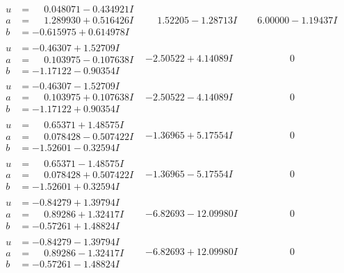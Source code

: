 \documentclass[1p]{elsarticle_modified}
\theoremstyle{definition}
\begin{document}
$$\begin{array}{c|c|c}
\begin{aligned}
u &= \phantom{-}0.048071 - 0.434921 I \\
a &= \phantom{-}1.289930 + 0.516426 I \\
b &= -0.615975 + 0.614978 I\end{aligned}
 & \phantom{-}1.52205 - 1.28713 I & \phantom{-}6.00000 - 1.19437 I \\ \hline\begin{aligned}
u &= -0.46307 + 1.52709 I \\
a &= \phantom{-}0.103975 - 0.107638 I \\
b &= -1.17122 - 0.90354 I\end{aligned}
 & -2.50522 + 4.14089 I & \phantom{-0.000000 } 0 \\ \hline\begin{aligned}
u &= -0.46307 - 1.52709 I \\
a &= \phantom{-}0.103975 + 0.107638 I \\
b &= -1.17122 + 0.90354 I\end{aligned}
 & -2.50522 - 4.14089 I & \phantom{-0.000000 } 0 \\ \hline\begin{aligned}
u &= \phantom{-}0.65371 + 1.48575 I \\
a &= \phantom{-}0.078428 - 0.507422 I \\
b &= -1.52601 - 0.32594 I\end{aligned}
 & -1.36965 + 5.17554 I & \phantom{-0.000000 } 0 \\ \hline\begin{aligned}
u &= \phantom{-}0.65371 - 1.48575 I \\
a &= \phantom{-}0.078428 + 0.507422 I \\
b &= -1.52601 + 0.32594 I\end{aligned}
 & -1.36965 - 5.17554 I & \phantom{-0.000000 } 0 \\ \hline\begin{aligned}
u &= -0.84279 + 1.39794 I \\
a &= \phantom{-}0.89286 + 1.32417 I \\
b &= -0.57261 + 1.48824 I\end{aligned}
 & -6.82693 - 12.09980 I & \phantom{-0.000000 } 0 \\ \hline\begin{aligned}
u &= -0.84279 - 1.39794 I \\
a &= \phantom{-}0.89286 - 1.32417 I \\
b &= -0.57261 - 1.48824 I\end{aligned}
 & -6.82693 + 12.09980 I & \phantom{-0.000000 } 0 \\ \hline\begin{aligned}

\end{aligned}
\end{array}$$
\end{document}
